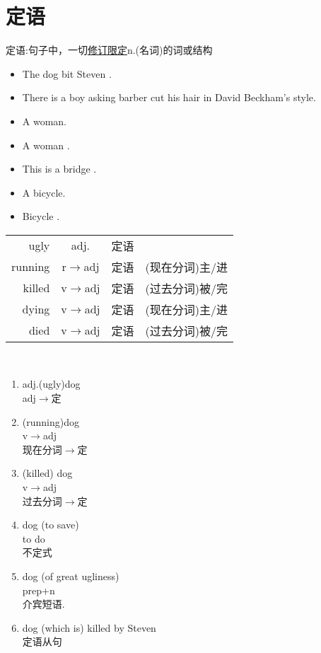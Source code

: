 \section{定语}
\begin{definition}
	定语:句子中，一切\uline{修订限定}n.(名词)的词或结构
\end{definition}
\begin{example}
\end{example}
\begin{itemize}
	\item The  dog \bl{}  bit  Steven .
	\item There is a boy asking barber cut his hair in David Beckham's style.
	\item A  woman.
	\item A woman .
	\item This is a bridge .
	\item A  bicycle.
	\item Bicycle .
\end{itemize}
\begin{tabular}{rcll}
	ugly&adj.&定语&\\
	running&r$\rightarrow$adj&定语&(现在分词)主/进\\
	killed&v$\rightarrow$adj&定语&(过去分词)被/完\\
	dying&v$\rightarrow$adj&定语&(现在分词)主/进\\
	died&v$\rightarrow$adj&定语&(过去分词)被/完
\end{tabular}
\\
\begin{enumerate}
	\item adj.(ugly)dog\\adj$\rightarrow$定
	\item (running)dog\\v$\rightarrow$adj\\现在分词$\rightarrow$定
	\item (killed) dog\\v$\rightarrow$adj\\过去分词$\rightarrow$定
	\item dog (to save)\\to do\\不定式
	\item dog (of great ugliness)\\prep+n\\介宾短语.
	\item dog (which is) killed by Steven\\定语从句
\end{enumerate}